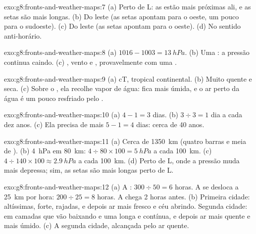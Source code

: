 \begin{solution}{exo:g8:fronts-and-weather-maps:7}
(a) Perto de L: as  estão mais próximas ali, e as setas são mais
longas. (b) Do leste (as setas apontam para o oeste, um pouco para o
sudoeste). (c) Do leste (as setas apontam para o oeste). (d) No sentido
anti-horário.
\end{solution}

\begin{solution}{exo:g8:fronts-and-weather-maps:8}
(a) $1016 - 1003 = \qty{13}{hPa}$. (b) Uma : a pressão continua
caindo. (c) , vento e , provavelmente com uma .
\end{solution}

\begin{solution}{exo:g8:fronts-and-weather-maps:9}
(a) cT, tropical continental. (b) Muito quente e seca. (c) Sobre o ,
ela recolhe vapor de água: fica mais úmida, e o ar perto da água é um
pouco resfriado pelo .
\end{solution}

\begin{solution}{exo:g8:fronts-and-weather-maps:10}
(a) $4 - 1 = 3$ dias. (b) $3 \div 3 = 1$ dia a cada dez anos. (c) Ela
precisa de mais $5 - 1 = 4$ dias: cerca de 40 anos.
\end{solution}

\begin{solution}{exo:g8:fronts-and-weather-maps:11}
(a) Cerca de \qty{1350}{km} (quatro barras e meia de ). (b) \qty{4}{hPa}
em \qty{80}{km}: $4 \div 80 \times 100 = \qty{5}{hPa}$ a cada
\qty{100}{km}. (c) $4 \div 140 \times 100 \approx \qty{2.9}{hPa}$ a cada
\qty{100}{km}. (d) Perto de L, onde a pressão muda mais depressa; sim, as
setas são mais longas perto de L.
\end{solution}

\begin{solution}{exo:g8:fronts-and-weather-maps:12}
(a) A : $300 \div 50 = 6$ horas. A  se desloca a
\qty{25}{km} por hora: $200 \div 25 = 8$ horas. A  chega
2 horas antes. (b) Primeira cidade:  altíssimas,  forte,
rajadas, e depois ar mais fresco e céu abrindo. Segunda cidade:  em
camadas que vão baixando e uma  longa e contínua, e depois ar mais
quente e mais úmido. (c) A segunda cidade, alcançada pelo ar quente.
\end{solution}

